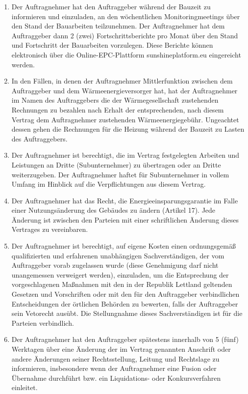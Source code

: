 \begin{multicols}{2}
\begin{enumerate}
   \item Der Auftragnehmer hat den Auftraggeber während der Bauzeit zu informieren und einzuladen, an den wöchentlichen Monitoringmeetings über den Stand der Bauarbeiten teilzunehmen. Der Auftragnehmer hat dem Auftraggeber dann 2 (zwei) Fortschrittsberichte pro Monat über den Stand und Fortschritt der Bauarbeiten vorzulegen. Diese Berichte können elektronisch über die Online-EPC-Plattform sunshineplatform.eu eingereicht werden.
   \item In den Fällen, in denen der Auftragnehmer Mittlerfunktion zwischen dem Auftraggeber und dem Wärmeenergieversorger hat, hat der Auftragnehmer im Namen des Auftraggebers die der Wärmegesellschaft zustehenden Rechnungen zu bezahlen nach Erhalt der entsprechenden, nach diesem Vertrag  dem Auftragnehmer zustehenden Wärmeenergiegebühr. Ungeachtet dessen gehen die Rechnungen für die Heizung während der Bauzeit zu Lasten des Auftraggebers.
   \item Der Auftragnehmer ist berechtigt, die im Vertrag festgelegten Arbeiten und Leistungen an Dritte (Subunternehmer) zu übertragen oder an Dritte weiterzugeben. Der Auftragnehmer haftet für Subunternehmer in vollem Umfang im Hinblick auf die Verpflichtungen aus diesem Vertrag.
   \item Der Auftragnehmer hat das Recht, die Energieeinsparungsgarantie im Falle einer Nutzungsänderung des Gebäudes zu ändern (Artikel 17). Jede Änderung ist zwischen den Parteien mit einer schriftlichen Änderung dieses Vertrages zu vereinbaren.
   \item Der Auftragnehmer ist berechtigt, auf eigene Kosten einen ordnungsgemäß qualifizierten und erfahrenen unabhängigen Sachverständigen, der vom Auftraggeber vorab zugelassen wurde (diese Genehmigung darf nicht unangemessen verweigert werden), einzuladen, um die Entsprechung der vorgeschlagenen Maßnahmen mit den in der Republik Lettland geltenden Gesetzen und Vorschriften oder mit den für den Auftraggeber verbindlichen Entscheidungen der örtlichen Behörden zu bewerten, falls der Auftraggeber sein Vetorecht ausübt. Die Stellungnahme dieses Sachverständigen ist für die Parteien verbindlich.
   \item Der Auftragnehmer hat den Auftraggeber spätestens innerhalb von 5 (fünf) Werktagen über eine Änderung der im Vertrag genannten Anschrift oder andere Änderungen seiner Rechtsstellung, Leitung und Rechtslage zu informieren, insbesondere wenn der Auftragnehmer eine Fusion oder Übernahme durchführt bzw. ein Liquidations- oder Konkursverfahren einleitet.
  \end{enumerate}


\end{multicols}
